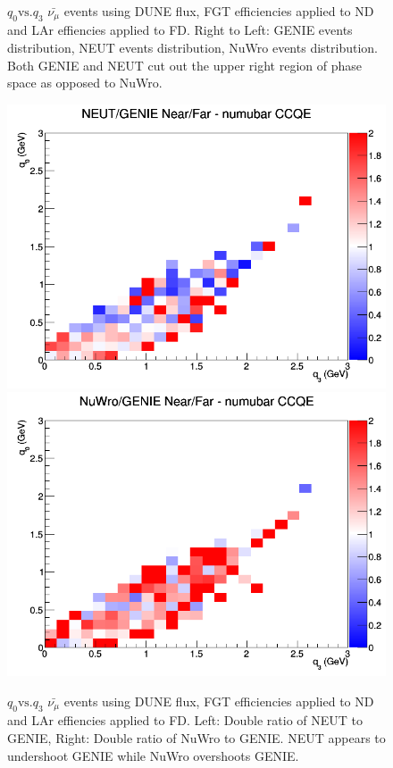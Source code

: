 \documentclass[12pt]{article}
\begin{document}
\begin{figure}[h]
\endminipage
\caption{$q_0 \textrm{vs.} q_3$ $\bar{\nu_{\mu}}$ events using DUNE flux, FGT efficiencies applied to ND and LAr effiencies applied to FD. Right to Left: GENIE events distribution, NEUT events distribution, NuWro events distribution. Both GENIE and NEUT cut out the upper right region of phase space as opposed to NuWro.}
\label{fig:q0q3_numubar_CCQE_events_FGT_eff}
\end{figure}
\begin{figure}[h]
\centering
{}
\includegraphics[width=\linewidth]{eff_q0_q3/FGT/ratios/CCQE_NEUT_GENIE_numubar_NF_q3_q0.png}
\endminipage
{}
\includegraphics[width=\linewidth]{eff_q0_q3/FGT/ratios/CCQE_NuWro_GENIE_numubar_NF_q3_q0.png}
\endminipage
\caption{$q_0 \textrm{vs.} q_3$ $\bar{\nu_{\mu}}$ events using DUNE flux, FGT efficiencies applied to ND and LAr effiencies applied to FD. Left: Double ratio of NEUT to GENIE, Right: Double ratio of NuWro to GENIE. NEUT appears to undershoot GENIE while NuWro overshoots GENIE.}
\label{fig:q0q3_numubar_CCQE_FGT_eff}
\end{figure}
\end{document}
